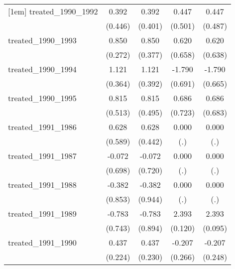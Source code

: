 {\begin{tabular}{l*{4}{c}}
[1em]
treated\_1990\_1992&       0.392         &       0.392         &       0.447         &       0.447         \\
            &     (0.446)         &     (0.401)         &     (0.501)         &     (0.487)         \\
[1em]
treated\_1990\_1993&       0.850\sym{**} &       0.850\sym{*}  &       0.620         &       0.620         \\
            &     (0.272)         &     (0.377)         &     (0.658)         &     (0.638)         \\
[1em]
treated\_1990\_1994&       1.121\sym{**} &       1.121\sym{**} &      -1.790\sym{**} &      -1.790\sym{**} \\
            &     (0.364)         &     (0.392)         &     (0.691)         &     (0.665)         \\
[1em]
treated\_1990\_1995&       0.815         &       0.815         &       0.686         &       0.686         \\
            &     (0.513)         &     (0.495)         &     (0.723)         &     (0.683)         \\
[1em]
treated\_1991\_1986&       0.628         &       0.628         &       0.000         &       0.000         \\
            &     (0.589)         &     (0.442)         &         (.)         &         (.)         \\
[1em]
treated\_1991\_1987&      -0.072         &      -0.072         &       0.000         &       0.000         \\
            &     (0.698)         &     (0.720)         &         (.)         &         (.)         \\
[1em]
treated\_1991\_1988&      -0.382         &      -0.382         &       0.000         &       0.000         \\
            &     (0.853)         &     (0.944)         &         (.)         &         (.)         \\
[1em]
treated\_1991\_1989&      -0.783         &      -0.783         &       2.393\sym{***}&       2.393\sym{***}\\
            &     (0.743)         &     (0.894)         &     (0.120)         &     (0.095)         \\
[1em]
treated\_1991\_1990&       0.437         &       0.437         &      -0.207         &      -0.207         \\
            &     (0.224)         &     (0.230)         &     (0.266)         &     (0.248)         \\

\end{tabular}}
